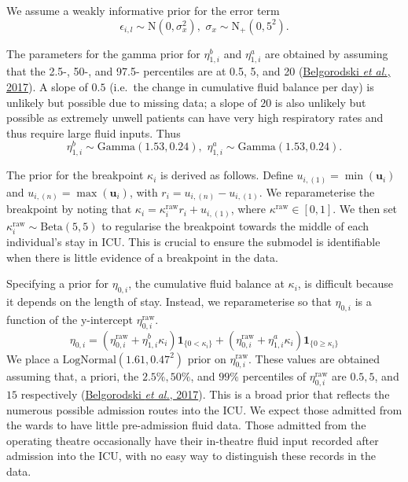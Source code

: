 \documentclass[
  10pt,
  a4paper,
]{article}
\begin{document}
We assume a weakly informative prior for the error term \begin{equation}
  \epsilon_{i, l} \sim \text{N}(0, \sigma^{2}_{x}),  \,\, \sigma_{x} \sim \text{N}_{+}(0, 5^2).
\end{equation}

The parameters for the gamma prior for \(\eta^{b}_{1, i}\) and
\(\eta^{a}_{1, i}\) are obtained by assuming that the 2.5-, 50-, and
97.5- percentiles are at 0.5, 5, and 20
(\protect\hyperlink{ref-belgorodski_rriskdistributions_2017}{Belgorodski
\emph{et al.}, 2017}). A slope of \(0.5\) (i.e.~the change in cumulative
fluid balance per day) is unlikely but possible due to missing data; a
slope of \(20\) is also unlikely but possible as extremely unwell
patients can have very high respiratory rates and thus require large
fluid inputs. Thus \begin{equation}
  \eta^{b}_{1, i} \sim \text{Gamma}(1.53, 0.24), \,\, \eta^{a}_{1, i} \sim \text{Gamma}(1.53, 0.24).
\end{equation}

The prior for the breakpoint \(\kappa_{i}\) is derived as follows.
Define \(u_{i, (1)} = \min(\boldsymbol{u}_{i})\) and
\(u_{i, (n)} = \max(\boldsymbol{u}_{i})\), with
\(r_{i} = u_{i, (n)} - u_{i, (1)}\). We reparameterise the breakpoint by
noting that \(\kappa_{i} = \kappa^{\text{raw}}_{i}r_{i} + u_{i, (1)}\),
where \(\kappa^{\text{raw}} \in [0, 1]\). We then set
\(\kappa^{\text{raw}}_{i} \sim \text{Beta}(5, 5)\) to regularise the
breakpoint towards the middle of each individual's stay in ICU. This is
crucial to ensure the submodel is identifiable when there is little
evidence of a breakpoint in the data.

Specifying a prior for \(\eta_{0, i}\), the cumulative fluid balance at
\(\kappa_{i}\), is difficult because it depends on the length of stay.
Instead, we reparameterise so that \(\eta_{0, i}\) is a function of the
y-intercept \(\eta_{0, i}^{\text{raw}}\). \begin{equation}
  \eta_{0, i} =
    (\eta_{0, i}^{\text{raw}} + \eta^{b}_{1, i} \kappa_{i}) \boldsymbol{1}_{\{0 < \kappa_{i}\}} +
    (\eta_{0, i}^{\text{raw}} + \eta^{a}_{1, i} \kappa_{i}) \boldsymbol{1}_{\{0 \geq \kappa_{i}\}}
\end{equation} We place a \(\text{LogNormal}(1.61, 0.47^2)\) prior on
\(\eta_{0, i}^{\text{raw}}\). These values are obtained assuming that, a
priori, the \(2.5\%, 50\%\), and \(99\%\) percentiles of
\(\eta_{0, i}^{\text{raw}}\) are \(0.5, 5\), and \(15\) respectively
(\protect\hyperlink{ref-belgorodski_rriskdistributions_2017}{Belgorodski
\emph{et al.}, 2017}). This is a broad prior that reflects the numerous
possible admission routes into the ICU. We expect those admitted from
the wards to have little pre-admission fluid data. Those admitted from
the operating theatre occasionally have their in-theatre fluid input
recorded after admission into the ICU, with no easy way to distinguish
these records in the data.
\end{document}
